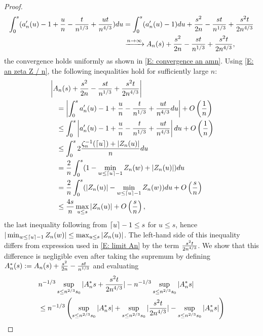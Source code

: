 \begin{proof}
	\begin{align*}
	\int_{0}^{s} (a'_n(u) - 1 + \frac{u}{n} - \frac{t}{n^{1 / 3}} + \frac{ut}{n^{4 / 3}}) du
	&= \int_{0}^{s}(a'_n(u) - 1) du + \frac{s^2}{2n} - \frac{st}{n^{1 / 3}} + \frac{s^2t}{2n^{4 / 3}} \\
	&\xrightarrow{n \rightarrow \infty} A_n(s) + \frac{s^2}{2n} - \frac{st}{n^{1 / 3}} + \frac{s^2t}{2n^{4 / 3}},
	\end{align*}
	the convergence holds uniformly as shown in \eqref{E: convergence an amn}.
	Using \eqref{E: an zeta Z / n}, the following inequalities hold for sufficiently large $n$:
	\begin{equation} \label{E: int an <= 4s/n maxZ + O()}
	\begin{aligned}
	&\left| A_n(s) + \frac{s^2}{2n} - \frac{st}{n^{1 / 3}}  + \frac{s^2t}{2n^{4 / 3}}  \right| \\
	&\quad = \left| \int_{0}^{s} a'_n(u) - 1 + \frac{u}{n} - \frac{t}{n^{1 / 3}} + \frac{ut}{n^{4 / 3}} du \right| + O\left(\frac{1}{n}\right) \\
	&\quad \leq \int_{0}^{s} \left|a'_n(u) - 1 + \frac{u}{n} - \frac{t}{n^{1 / 3}} + \frac{ut}{n^{4 / 3}} \right| du + O\left(\frac{1}{n}\right) \\ 
	&\quad \leq \int_{0}^{s} 2 \frac{\zeta^{-1}_n(\lceil u\rceil) + |Z_n(u)|}{n} du \\ 
	&\quad = \frac{2}{n}  \int_{0}^{s} (1-\min_{w \leq \lceil u\rceil-1} Z_n(w)  + |Z_n(u)| )du \\ 
	&\quad = \frac{2}{n}  \int_{0}^{s} (|Z_n(u)| - \min_{w \leq \lceil u\rceil-1} Z_n(w)) du + O\left(\frac{s}{n}\right) \\ 
	&\quad \leq \frac{4s}{n} \max_{u \leq s} |Z_n(u)| + O\left(\frac{s}{n}\right),
	\end{aligned}
	\end{equation}
    the last inequality following from $\lceil u\rceil-1 \leq s$ for $u\leq s$, hence $|\min_{w \leq \lceil u\rceil-1}Z_n(w)| \leq \max_{u \leq s}|Z_n(u)|$.
    The left-hand side of this inequality differs from expression used in \eqref{E: limit An} by the term $\frac{s^2t}{2n^{4 / 3}}$.
    We show that this difference is negligible even after taking the supremum by defining $A^*_n(s) := A_n(s) + \frac{s^2}{2n} - \frac{st}{n^{1 / 3}}$
    and evaluating
    \begin{align*}
    &\n{-1}{3}\supns | A^*_n{s} + \frac{s^2t}{2\n{4}{3}}  | - \n{-1}{3}\supns | A^*_n{s} | \\
    &\leq \n{-1}{3} \left( \supns | A^*_n{s} | + \supns |\frac{s^2t}{2\n{4}{3}}|  - \supns | A^*_n{s} | \right) \\

\end{align*}
\end{proof}
